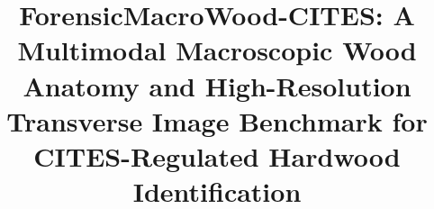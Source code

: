 \documentclass[a4paper,fleqn,12pt]{cas-sc}
\newcommand{\orcidicon}[1]{\href{https://orcid.org/#1}{\texorpdfstring{%
\begin{tikzpicture}[baseline=-0.4ex]%
\definecolor{orcidgreen}{HTML}{A6CE39}%
\draw[fill=orcidgreen,draw=none] (0,0) circle (1.0ex);%
\node at (0,0) {\color{white}\fontsize{4}{4}\selectfont\sffamily\bfseries iD};%
\end{tikzpicture}%
}{}}}
\begin{document}
\let\WriteBookmarks\relax


\title [mode = title]{ForensicMacroWood-CITES: A Multimodal Macroscopic Wood Anatomy and High-Resolution Transverse Image Benchmark for CITES-Regulated Hardwood Identification}



\end{document}
